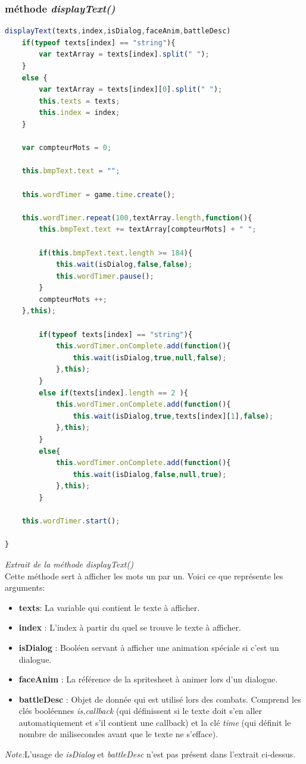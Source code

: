 \documentclass[11pt]{article}
\begin{document}
\subsubsection{méthode \textit{displayText()}}
\begin{lstlisting}[language=JavaScript]
displayText(texts,index,isDialog,faceAnim,battleDesc)
    if(typeof texts[index] == "string"){
        var textArray = texts[index].split(" "); 
    }
    else {
        var textArray = texts[index][0].split(" ");
        this.texts = texts;
        this.index = index;
    }

    var compteurMots = 0;

    this.bmpText.text = "";

    this.wordTimer = game.time.create();

    this.wordTimer.repeat(100,textArray.length,function(){
        this.bmpText.text += textArray[compteurMots] + " ";

        if(this.bmpText.text.length >= 184){
            this.wait(isDialog,false,false);
            this.wordTimer.pause();
        }
        compteurMots ++;
    },this);
  
        if(typeof texts[index] == "string"){
            this.wordTimer.onComplete.add(function(){
                this.wait(isDialog,true,null,false);
            },this); 
        }
        else if(texts[index].length == 2 ){
            this.wordTimer.onComplete.add(function(){
                this.wait(isDialog,true,texts[index][1],false);
            },this);
        }
        else{
            this.wordTimer.onComplete.add(function(){
                this.wait(isDialog,false,null,true);
            },this);
        }
    
    this.wordTimer.start();

}
\end{lstlisting} 
\textit{Extrait de la méthode displayText()}\\
Cette méthode sert à afficher les mots un par un. Voici ce que représente les arguments:\\
\begin{itemize}
\item \textbf{texts}: La variable qui contient le texte à afficher.
\item \textbf{index} : L'index à partir du quel se trouve le texte à afficher.
\item \textbf{isDialog} : Booléen servant à afficher une animation spéciale si c'est un dialogue.
\item \textbf{faceAnim} : La référence de la spritesheet à animer lors d'un dialogue.
\item \textbf{battleDesc} : Objet de donnée qui est utilisé lors des combats. Comprend les clés booléennes \textit{is,callback} (qui définissent si le texte doit s'en aller automatiquement et s'il contient une callback) et la clé \textit{time} (qui définit le nombre de milisecondes avant que le texte ne s'efface).
\end{itemize}
\textit{Note:}L'usage de \textit{isDialog} et \textit{battleDesc} n'est pas présent dans l'extrait ci-dessus.\\
\end{document}
